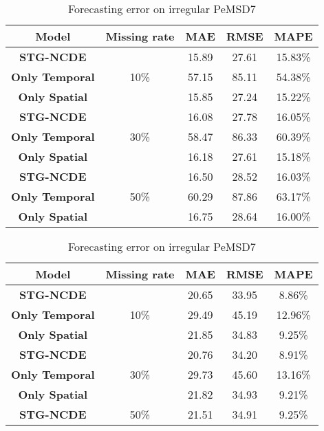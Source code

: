 \documentclass[letterpaper]{article} \usepackage{aaai22}  \usepackage{times}  \usepackage{helvet}  \usepackage{courier}  \usepackage[hyphens]{url}  \usepackage{graphicx} \urlstyle{rm} \def\UrlFont{\rm}  \usepackage{natbib}  \usepackage{caption} \DeclareCaptionStyle{ruled}{labelfont=normalfont,labelsep=colon,strut=off} \frenchspacing  \setlength{\pdfpagewidth}{8.5in}  \setlength{\pdfpageheight}{11in}  \usepackage{stfloats}
\begin{document}
\begin{table}[!ht]
\centering
\setlength{\tabcolsep}{4pt}
\caption{Forecasting error on irregular PeMSD3}\label{tbl:missing_pemsd3}
\begin{tabular}{cc ccc}
\hline
Model                  & Missing rate         &  MAE   &     RMSE    &   MAPE  \\ \hline
\textbf{STG-NCDE}      & \multirow{3}{*}{10\%}&  15.89 & 27.61  & 15.83\% \\ 
\textbf{Only Temporal} &                      & 57.15  & 85.11  & 54.38\% \\\textbf{Only Spatial } &                      & 15.85  & 27.24  & 15.22\% \\\hline
\textbf{STG-NCDE}      & \multirow{3}{*}{30\%}& 16.08  & 27.78  & 16.05\% \\ \textbf{Only Temporal} &                      & 58.47  & 86.33  & 60.39\% \\ \textbf{Only Spatial } &                      & 16.18  & 27.61  & 15.18\% \\\hline \textbf{STG-NCDE}      & \multirow{3}{*}{50\%}& 16.50  & 28.52  & 16.03\% \\
\textbf{Only Temporal} &                      & 60.29  & 87.86 & 63.17\% \\
\textbf{Only Spatial } &                      & 16.75  & 28.64  & 16.00\% \\\hline \end{tabular}\vspace{1em}
\centering
\setlength{\tabcolsep}{4pt}
\caption{Forecasting error on irregular PeMSD7}\label{tbl:missing_pemsd7}
\begin{tabular}{cc ccc}
\hline
Model                  & Missing rate         &  MAE   &     RMSE    &   MAPE  \\ \hline
\textbf{STG-NCDE}      & \multirow{3}{*}{10\%}& 20.65  & 33.95  &  8.86\% \\
\textbf{Only Temporal} &                      & 29.49  & 45.19  & 12.96\% \\
\textbf{Only Spatial } &                      & 21.85  & 34.83  &  9.25\% \\\hline
\textbf{STG-NCDE}      & \multirow{3}{*}{30\%}& 20.76  & 34.20  &  8.91\% \\
\textbf{Only Temporal} &                      & 29.73  & 45.60  & 13.16\% \\
\textbf{Only Spatial } &                      & 21.82  & 34.93  &  9.21\% \\ \hline
\textbf{STG-NCDE}      & \multirow{3}{*}{50\%}& 21.51  & 34.91  &  9.25\% \\

\end{tabular}
\end{table}
\end{document}
